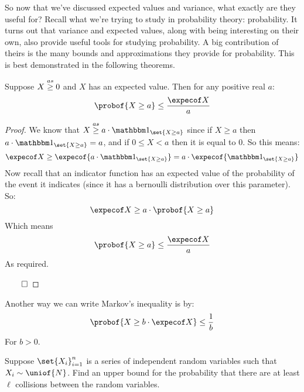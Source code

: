 So now that we've discussed expected values and variance, what exactly are they useful for?
Recall what we're trying to study in probability theory: probability.
It turns out that variance and expected values, along with being interesting on their own, also provide
useful tools for studying probability.
A big contribution of theirs is the many bounds and approximations they provide for probability.
This is best demonstrated in the following theorems.

\begin{thrm*}

	Suppose $X\mathrel{\overset{as}\geq}0$ and $X$ has an expected value. Then for any positive real $a$:
	\[ \probof{X\geq a} \leq \frac{\expecof X}a \]

\end{thrm*}

\begin{proof}

	We know that $X\asgeq a\cdot\bone_{\set{X\geq a}}$ since if $X\geq a$ then
	$a\cdot\bone_{\set{X\geq a}}=a$, and if $0\leq X<a$ then it is equal to $0$.
	So this means:
	\[ \expecof X\geq \expecof{a\cdot\bone_{\set{X\geq a}}} = a\cdot\expecof{\bone_{\set{X\geq a}}} \]
	Now recall that an indicator function has an expected value of the probability of the event it indicates
	(since it has a bernoulli distribution over this parameter).
	So:
	\[ \expecof X\geq a\cdot\probof{X\geq a} \]
	Which means
	\[ \probof{X\geq a} \leq \frac{\expecof X}a \]
	As required.

	\hfill$\qed$

\end{proof}

Another way we can write Markov's inequality is by:
\[ \probof{X\geq b\cdot\expecof X} \leq \frac1b \]
For $b>0$.

\begin{exercise}

	Suppose $\set{X_i}_{i=1}^n$ is a series of independent random variables such that $X_i\sim\uniof{N}$.
	Find an upper bound for the probability that there are at least $\ell$ collisions between the random
	variables.

\end{exercise}

